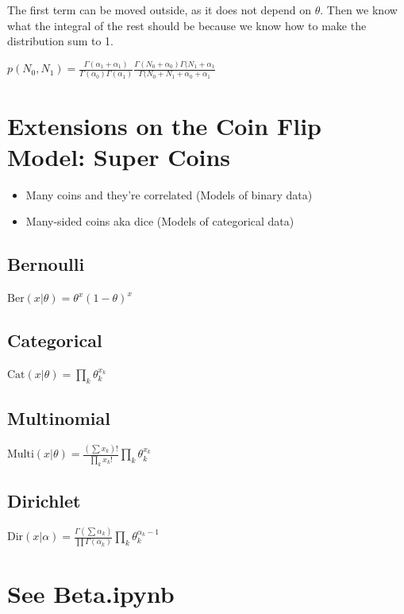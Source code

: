 \documentclass[twoside]{article}
\begin{document}
The first term can be moved outside, as it does not depend on $\theta$. Then we know what the integral of the rest should be because we know how to make the distribution sum to 1.

$p(N_0, N_1) = \frac{\Gamma( \alpha_1 +  \alpha_1)}{\Gamma(\alpha_0)\Gamma(\alpha_1)} \frac{\Gamma(N_0 + \alpha_0)\Gamma(N_1 + \alpha_1}{\Gamma(N_0 + N_1 + \alpha_0 + \alpha_1}$

\section{Extensions on the Coin Flip Model: Super Coins}
\begin{itemize}
\item Many coins and they're correlated (Models of binary data)
\item Many-sided coins aka dice (Models of categorical data)
\end{itemize}

\subsection{Bernoulli}
$\textrm{Ber}(x|\theta) = \theta^{x}(1-\theta)^x$
\subsection{Categorical}
$\textrm{Cat}(x|\theta) = \prod_k\theta_k^{x_k}$
\subsection{Multinomial}
$\textrm{Multi}(x|\theta) = \frac{(\sum x_k) !}{\prod_k x_k!}\prod_k\theta_k^{x_k}$
\subsection{Dirichlet}
$\textrm{Dir}(x|\alpha) = \frac{\Gamma(\sum \alpha_k)}{\prod \Gamma(\alpha_k)}\prod_k\theta_k^{\alpha_k-1}$

\section{See Beta.ipynb}
\end{document}
